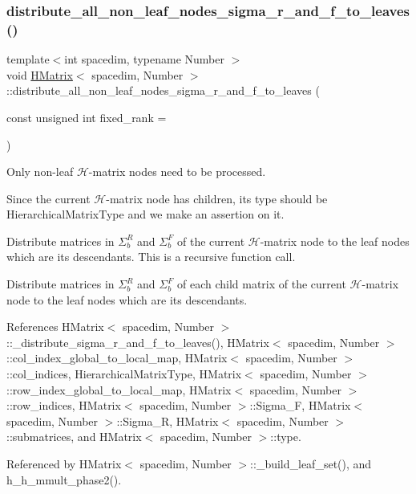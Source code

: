 \subsubsection{\texorpdfstring{distribute\+\_\+all\+\_\+non\+\_\+leaf\+\_\+nodes\+\_\+sigma\+\_\+r\+\_\+and\+\_\+f\+\_\+to\+\_\+leaves()}{distribute\_all\_non\_leaf\_nodes\_sigma\_r\_and\_f\_to\_leaves()}}
{\footnotesize\ttfamily template$<$int spacedim, typename Number $>$ \\
void \hyperlink{classHMatrix}{H\+Matrix}$<$ spacedim, Number $>$\+::distribute\+\_\+all\+\_\+non\+\_\+leaf\+\_\+nodes\+\_\+sigma\+\_\+r\+\_\+and\+\_\+f\+\_\+to\+\_\+leaves (\begin{DoxyParamCaption}\item[{const unsigned int}]{fixed\+\_\+rank = {} }\end{DoxyParamCaption})\hspace{0.3cm}{\ttfamily [private]}}

Only non-\/leaf $\mathcal{H}$-\/matrix nodes need to be processed.

Since the current $\mathcal{H}$-\/matrix node has children, its type should be {\ttfamily Hierarchical\+Matrix\+Type} and we make an assertion on it.

Distribute matrices in $\Sigma_b^R$ and $\Sigma_b^F$ of the current $\mathcal{H}$-\/matrix node to the leaf nodes which are its descendants. This is a recursive function call.

Distribute matrices in $\Sigma_b^R$ and $\Sigma_b^F$ of each child matrix of the current $\mathcal{H}$-\/matrix node to the leaf nodes which are its descendants.

References H\+Matrix$<$ spacedim, Number $>$\+::\+\_\+distribute\+\_\+sigma\+\_\+r\+\_\+and\+\_\+f\+\_\+to\+\_\+leaves(), H\+Matrix$<$ spacedim, Number $>$\+::col\+\_\+index\+\_\+global\+\_\+to\+\_\+local\+\_\+map, H\+Matrix$<$ spacedim, Number $>$\+::col\+\_\+indices, Hierarchical\+Matrix\+Type, H\+Matrix$<$ spacedim, Number $>$\+::row\+\_\+index\+\_\+global\+\_\+to\+\_\+local\+\_\+map, H\+Matrix$<$ spacedim, Number $>$\+::row\+\_\+indices, H\+Matrix$<$ spacedim, Number $>$\+::\+Sigma\+\_\+F, H\+Matrix$<$ spacedim, Number $>$\+::\+Sigma\+\_\+R, H\+Matrix$<$ spacedim, Number $>$\+::submatrices, and H\+Matrix$<$ spacedim, Number $>$\+::type.



Referenced by H\+Matrix$<$ spacedim, Number $>$\+::\+\_\+build\+\_\+leaf\+\_\+set(), and h\+\_\+h\+\_\+mmult\+\_\+phase2().

